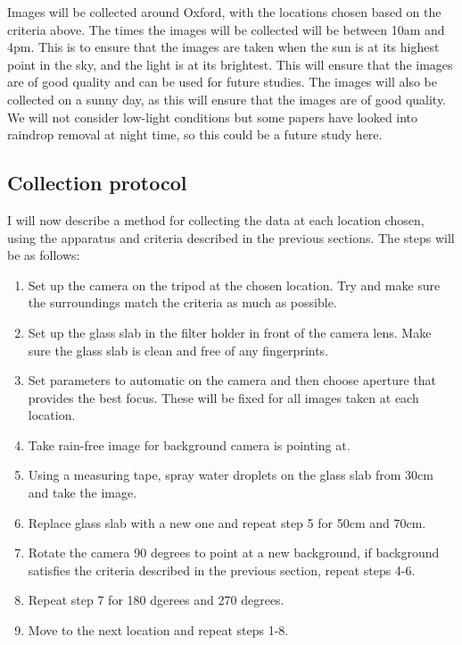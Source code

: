 \documentclass[11pt]{ociamthesis}  %
\begin{document}
Images will be collected around Oxford, with the locations chosen based on the criteria above. The times the images will be collected will be between 10am and 4pm. This is to ensure that the images are taken when the sun is at its highest point in the sky, and the light is at its brightest. This will ensure that the images are of good quality and can be used for future studies. The images will also be collected on a sunny day, as this will ensure that the images are of good quality. We will not consider low-light conditions but some papers have looked into raindrop removal at night time\cite{jin2024raindropclaritydualfocuseddataset}, so this could be a future study here.

\subsection{Collection protocol}

I will now describe a method for collecting the data at each location chosen, using the apparatus and criteria described in the previous sections. The steps will be as follows:

\begin{enumerate}
    \item Set up the camera on the tripod at the chosen location. Try and make sure the surroundings match the criteria as much as possible.
    \item Set up the glass slab in the filter holder in front of the camera lens. Make sure the glass slab is clean and free of any fingerprints.
    \item Set parameters to automatic on the camera and then choose aperture that provides the best focus. These will be fixed for all images taken at each location.
    \item Take rain-free image for background camera is pointing at.
    \item Using a measuring tape, spray water droplets on the glass slab from 30cm and take the image.
    \item Replace glass slab with a new one and repeat step 5 for 50cm and 70cm.
    \item Rotate the camera 90 degrees to point at a new background, if background satisfies the criteria described in the previous section, repeat steps 4-6.
    \item Repeat step 7 for 180 dgerees and 270 degrees.
    \item Move to the next location and repeat steps 1-8.
\end{enumerate}
\end{document}
